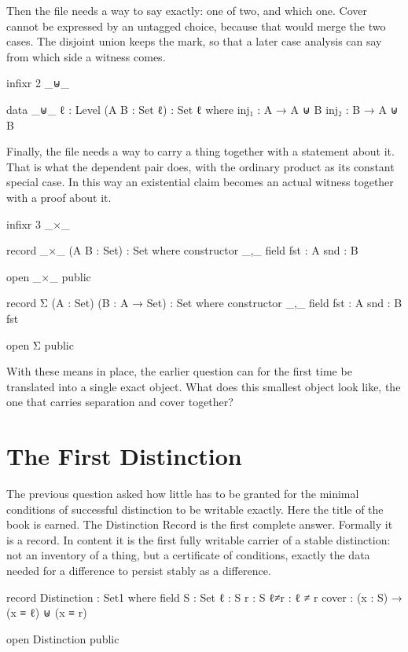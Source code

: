 \documentclass[11pt,a4paper]{book}
\begin{document}
Then the file needs a way to say exactly: one of two, and which one. Cover
cannot be expressed by an untagged choice, because that would merge the two
cases. The disjoint union keeps the mark, so that a later case analysis can
say from which side a witness comes.

\begin{code}
infixr 2 _⊎_

data _⊎_ {ℓ : Level} (A B : Set ℓ) : Set ℓ where
  inj₁ : A → A ⊎ B
  inj₂ : B → A ⊎ B
\end{code}

Finally, the file needs a way to carry a thing together with a statement
about it. That is what the dependent pair does, with the ordinary product
as its constant special case. In this way an existential claim becomes an
actual witness together with a proof about it.

\begin{code}
infixr 3 _×_

record _×_ (A B : Set) : Set where
  constructor _,_
  field
    fst : A
    snd : B

open _×_ public

record Σ (A : Set) (B : A → Set) : Set where
  constructor _,_
  field
    fst : A
    snd : B fst

open Σ public
\end{code}

With these means in place, the earlier question can for the first time be
translated into a single exact object. What does this smallest object look
like, the one that carries separation and cover together?

\chapter{The First Distinction}
\label{ch:the-record}

The previous question asked how little has to be granted for the minimal
conditions of successful distinction to be writable exactly. Here the title
of the book is earned. The Distinction Record is the first complete answer.
Formally it is a record. In content it is the first fully writable carrier
of a stable distinction: not an inventory of a thing, but a certificate of
conditions, exactly the data needed for a difference to persist stably as a
difference.

\begin{code}
record Distinction : Set1 where
  field
    S     : Set
    ℓ     : S
    r     : S
    ℓ≠r   : ℓ ≠ r
    cover : (x : S) → (x ≡ ℓ) ⊎ (x ≡ r)

open Distinction public
\end{code}
\end{document}
